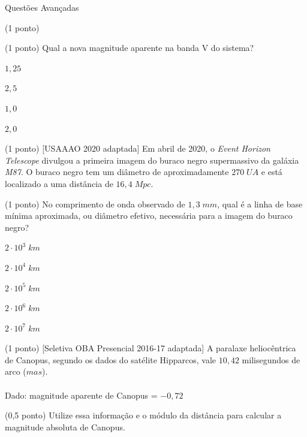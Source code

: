\documentclass{../lista}
\begin{document}
\begin{secao}{Questões Avançadas}
\begin{questao}{(1 ponto)}
			\begin{pergunta}{(1 ponto)}
				Qual a nova magnitude aparente na banda V do sistema?
				
				\begin{alternativas}
					\item $1,25$
					\item $2,5$
					\item $1,0$
					\item $2,0$
				\end{alternativas}
			\end{pergunta}
		\end{questao}
		
		\begin{questao}{(1 ponto) [USAAAO 2020 adaptada]}
			Em abril de 2020, o \textit{Event Horizon Telescope} divulgou a primeira imagem do buraco negro supermassivo da galáxia \textit{M87}. O buraco negro tem um diâmetro de aproximadamente $270 \; UA$ e está localizado a uma distância de $16,4 \; Mpc$.
			
			\begin{pergunta}{(1 ponto)}
				No comprimento de onda observado de $1,3 \; mm$, qual é a linha de base mínima aproximada, ou diâmetro efetivo, necessária para a imagem do buraco negro?
				
				\begin{alternativas}
					\item $2 \cdot 10^3 \; km$
					\item $2 \cdot 10^4 \; km$
					\item $2 \cdot 10^5 \; km$
					\item $2 \cdot 10^6 \; km$
					\item $2 \cdot 10^7 \; km$
				\end{alternativas}
			\end{pergunta}
		\end{questao}
		
		\begin{questao}{(1 ponto) [Seletiva OBA Presencial 2016-17 adaptada]}
			A paralaxe heliocêntrica de Canopus, segundo os dados do satélite Hipparcos, vale $10,42$ milisegundos de arco ($mas$). \\ \\
			Dado: magnitude aparente de Canopus = $-0,72$
			
			\begin{pergunta}{(0,5 ponto)}
				Utilize essa informação e o módulo da distância para calcular a magnitude absoluta de Canopus.
				

\end{pergunta}
\end{questao}
\end{secao}
\end{document}
